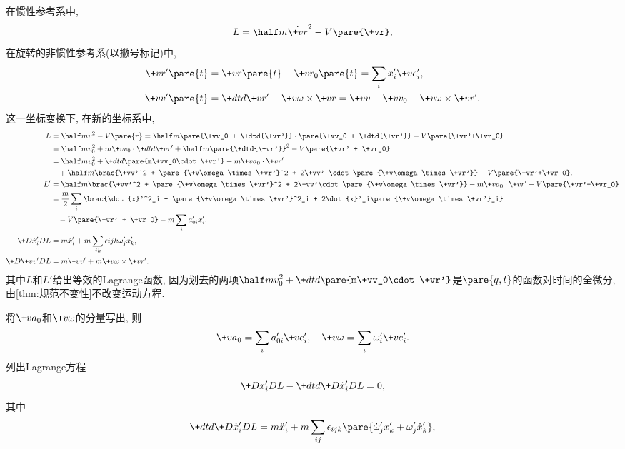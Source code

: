 \documentclass[../LectureNotes.tex]{subfiles}
\begin{document}
\begin{sample}
    \begin{ex}
        在惯性参考系中,
        \[ L = \half m\dot{\+vr}^2 - V\pare{\+vr}, \]
        在旋转的非惯性参考系(以撇号标记)中,
        \begin{align*}
            \+vr'\pare{t} &= \+vr\pare{t} - \+vr_0\pare{t} = \sum_i x'_i\+ve'_i ,\\
            \+vv'\pare{t} &= \+dtd{\+vr'} - \+v\omega\times\+vr = \+vv - \+vv_0 - \+v\omega\times\+vr'.
        \end{align*}
        这一坐标变换下, 在新的坐标系中,
        \begin{align*}
            L &= \half mv^2 - V\pare{r} = \half m\pare{\+vv_0 + \+dtd{\+vr'}}\cdot\pare{\+vv_0 + \+dtd{\+vr'}} - V\pare{\+vr'+\+vr_0} \\
            &= \half mv_0^2 + m\+vv_0\cdot\+dtd{\+vr'} + \half m\pare{\+dtd{\+vr'}}^2 - V\pare{\+vr' + \+vr_0} \\
            &= \half mv_0^2 + \+dtd{}\pare{m\+vv_0\cdot\+vr'} - m\+va_0\cdot\+vr' \\
            &\phantom{=}\, + \half m\brac{\+vv'^2 + \pare{\+v\omega\times\+vr'}^2 + 2\+vv' \cdot\pare{\+v\omega\times\+vr'}} - V\pare{\+vr'+\+vr_0}. \\
            L' &= \half m \brac{\+vv'^2 + \pare{\+v\omega\times\+vr'}^2 + 2\+vv'\cdot\pare{\+v\omega\times\+vr'}} - m\+va_0\cdot\+vr' - V\pare{\+vr'+\+vr_0} \\
            &= \frac{m}{2}\sum_i\brac{\dot{x}'^2_i + \pare{\+v\omega\times\+vr'}^2_i + 2\dot{x}'_i\pare{\+v\omega\times\+vr'}_i}\\
            &\phantom{=}\, - V\pare{\+vr' + \+vr_0} - m\sum_i a'_{0i}x'_i. \\
            \+D{\dot{x}'_i}DL &= m\dot{x}'_i + m\sum_{jk} \epsilon{ijk}\omega'_j x'_k, \\
            \+D{\+vv'}DL &= m\+vv' + m\+v\omega\times\+vr'.
        \end{align*}
        其中$L$和$L'$给出等效的Lagrange函数, 因为划去的两项$\displaystyle \half mv_0^2 + \+dtd{}\pare{m\+vv_0\cdot\+vr'}$是$\pare{q,t}$的函数对时间的全微分, 由\cref{thm:规范不变性}不改变运动方程.
        \par
        将$\+va_0$和$\+v\omega$的分量写出, 则
        \[ \+va_0 = \sum_i a'_{0i}\+ve'_i,\quad \+v\omega = \sum_i \omega'_i \+ve'_i. \]
        列出Lagrange方程
        \[ \+D{x'_i}DL - \+dtd{} \+D{\dot{x}'_i}DL = 0, \]
        其中
        \[ \+dtd{} \+D{\dot{x}'_i}DL = m\ddot{x}'_i + m\sum_{ij}\epsilon_{ijk}\pare{\dot{\omega}'_jx'_k + \omega'_j \dot{x}'_k}, \]

\end{ex}
\end{sample}
\end{document}
